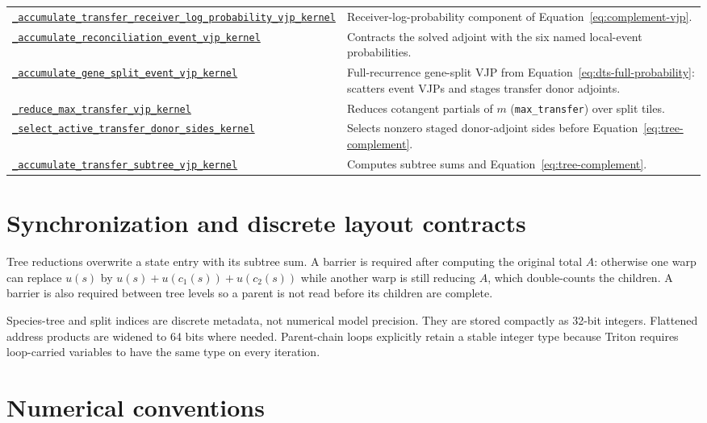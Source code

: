 \documentclass[11pt]{article}
\newcommand{\kernelref}[2]{\href{../../gpurec/core/kernels/#1}{\nolinkurl{#2}}}
\begin{document}
\begin{longtable}{>{\raggedright\arraybackslash}p{}
                  >{\raggedright\arraybackslash}p{}}
\kernelref{wave_backward_kernels.py}{_accumulate_transfer_receiver_log_probability_vjp_kernel} & Receiver-log-probability component of Equation~\eqref{eq:complement-vjp}. \\
\kernelref{wave_backward_kernels.py}{_accumulate_reconciliation_event_vjp_kernel} & Contracts the solved adjoint with the six named local-event probabilities. \\
\kernelref{wave_backward_kernels.py}{_accumulate_gene_split_event_vjp_kernel} & Full-recurrence gene-split VJP from Equation~\eqref{eq:dts-full-probability}: scatters event VJPs and stages transfer donor adjoints. \\
\kernelref{wave_backward_kernels.py}{_reduce_max_transfer_vjp_kernel} & Reduces cotangent partials of $m$ (\texttt{max\_transfer}) over split tiles. \\
\kernelref{wave_backward_kernels.py}{_select_active_transfer_donor_sides_kernel} & Selects nonzero staged donor-adjoint sides before Equation~\eqref{eq:tree-complement}. \\
\kernelref{wave_backward_kernels.py}{_accumulate_transfer_subtree_vjp_kernel} & Computes subtree sums and Equation~\eqref{eq:tree-complement}. \\
\bottomrule
\end{longtable}
\normalsize

\section{Synchronization and discrete layout contracts}

Tree reductions overwrite a state entry with its subtree sum.  A barrier is
required after computing the original total $A$: otherwise one warp can replace
$u(s)$ by $u(s)+u(c_1(s))+u(c_2(s))$ while another warp is still reducing $A$,
which double-counts the children.  A barrier is also required between tree
levels so a parent is not read before its children are complete.

Species-tree and split indices are discrete metadata, not numerical model
precision.  They are stored compactly as 32-bit integers.  Flattened address
products are widened to 64 bits where needed.  Parent-chain loops explicitly
retain a stable integer type because Triton requires loop-carried variables to
have the same type on every iteration.

\section{Numerical conventions}
\end{document}
